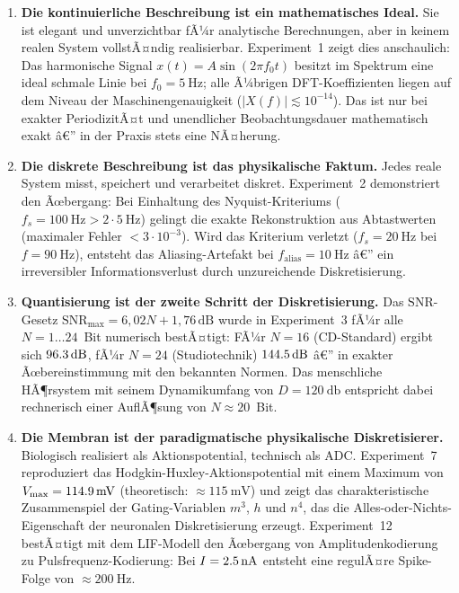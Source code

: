 ﻿\documentclass[12pt,a4paper,titlepage]{report}
\begin{document}
\begin{enumerate}[leftmargin=2em, label=\textbf{\arabic{enumi}.}]

	\item \textbf{Die kontinuierliche Beschreibung ist ein mathematisches Ideal.}
		Sie ist elegant und unverzichtbar fÃ¼r analytische Berechnungen,
		aber in keinem realen System vollstÃ¤ndig realisierbar.
		Experiment~1 zeigt dies anschaulich: Das harmonische Signal
		$x(t)=A\sin(2\pi f_0 t)$ besitzt im Spektrum eine ideal schmale
		Linie bei $f_0=\SI{5}{\hertz}$; alle Ã¼brigen DFT-Koeffizienten
		liegen auf dem Niveau der Maschinengenauigkeit
		($|X(f)| \lesssim 10^{-14}$).
		Das ist nur bei exakter PeriodizitÃ¤t und unendlicher Beobachtungsdauer
		mathematisch exakt â€” in der Praxis stets eine NÃ¤herung.

	\item \textbf{Die diskrete Beschreibung ist das physikalische Faktum.}
		Jedes reale System misst, speichert und verarbeitet diskret.
		Experiment~2 demonstriert den Ãœbergang: Bei Einhaltung des
		Nyquist-Kriteriums ($f_s=\SI{100}{\hertz} > 2\cdot\SI{5}{\hertz}$)
		gelingt die exakte Rekonstruktion aus Abtastwerten
		(maximaler Fehler $< 3\cdot10^{-3}$).
		Wird das Kriterium verletzt ($f_s=\SI{20}{\hertz}$ bei
		$f=\SI{90}{\hertz}$), entsteht das Aliasing-Artefakt bei
		$f_{\mathrm{alias}}=\SI{10}{\hertz}$ â€” ein irreversibler
		Informationsverlust durch unzureichende Diskretisierung.

	\item \textbf{Quantisierung ist der zweite Schritt der Diskretisierung.}
		Das $\mathrm{SNR}$-Gesetz $\mathrm{SNR}_{\max}=6{,}02N+1{,}76\,\mathrm{dB}$
		wurde in Experiment~3 fÃ¼r alle $N=1\ldots24$~Bit numerisch bestÃ¤tigt:
		FÃ¼r $N=16$ (CD-Standard) ergibt sich $\SI{96{,}3}{\decibel}$,
		fÃ¼r $N=24$ (Studiotechnik) $\SI{144{,}5}{\decibel}$ â€”
		in exakter Ãœbereinstimmung mit den bekannten Normen.
		Das menschliche HÃ¶rsystem mit seinem Dynamikumfang von
		$D=\SI{120}{\decibel}$ entspricht dabei rechnerisch
		einer AuflÃ¶sung von $N\approx20$~Bit.

	\item \textbf{Die Membran ist der paradigmatische physikalische Diskretisierer.}
		Biologisch realisiert als Aktionspotential, technisch als ADC.
		Experiment~7 reproduziert das Hodgkin-Huxley-Aktionspotential
		mit einem Maximum von $V_{\max}=\SI{114{,}9}{\milli\volt}$
		(theoretisch: $\approx\SI{115}{\milli\volt}$) und zeigt das
		charakteristische Zusammenspiel der Gating-Variablen $m^3$, $h$ und $n^4$,
		das die Alles-oder-Nichts-Eigenschaft der neuronalen Diskretisierung erzeugt.
		Experiment~12 bestÃ¤tigt mit dem LIF-Modell den Ãœbergang von
		Amplitudenkodierung zu Pulsfrequenz-Kodierung:
		Bei $I=\SI{2{,}5}{\nano\ampere}$ entsteht eine regulÃ¤re
		Spike-Folge von $\approx\SI{200}{\hertz}$.


\end{enumerate}
\end{document}
